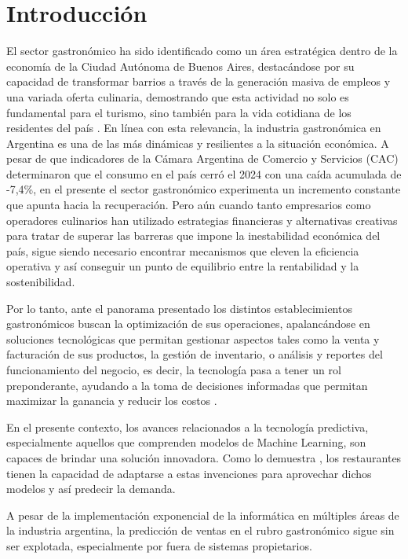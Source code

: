 \chapter{Introducción}

El sector gastronómico ha sido identificado como un área estratégica dentro de la economía de la Ciudad Autónoma de Buenos Aires, destacándose por su capacidad de transformar barrios a través de la generación masiva de empleos y una variada oferta culinaria, demostrando que esta actividad no solo es fundamental para el turismo, sino también para la vida cotidiana de los residentes del país \parencite{srsur2024gastronomico}. En línea con esta relevancia, la industria gastronómica en Argentina es una de las más dinámicas y resilientes a la situación económica. A pesar de que indicadores de la Cámara Argentina de Comercio y Servicios (CAC) \parencite{cac2024consumo} determinaron que el consumo en el país cerró el 2024 con una caída acumulada de -7,4\%, en el presente el sector gastronómico experimenta un incremento constante que apunta hacia la recuperación. Pero aún cuando tanto empresarios como operadores culinarios han utilizado estrategias financieras y alternativas creativas para tratar de superar las barreras que impone la inestabilidad económica del país, sigue siendo necesario encontrar mecanismos que eleven la eficiencia operativa y así conseguir un punto de equilibrio entre la rentabilidad y la sostenibilidad.

Por lo tanto, ante el panorama presentado los distintos establecimientos gastronómicos buscan la optimización de sus operaciones, apalancándose en soluciones tecnológicas que permitan gestionar aspectos tales como la venta y facturación de sus productos, la gestión de inventario, o análisis y reportes del funcionamiento del negocio, es decir, la tecnología pasa a tener un rol preponderante, ayudando a la toma de decisiones informadas que permitan maximizar la ganancia y reducir los costos  \parencite{agrawal2023predictive}.

En el presente contexto, los avances relacionados a la tecnología predictiva, especialmente aquellos que comprenden modelos de Machine Learning, son capaces de brindar una solución innovadora. Como lo demuestra \parencite{schmidt2022mlsales}, los restaurantes tienen la capacidad de adaptarse a estas invenciones para aprovechar dichos modelos y así predecir la demanda.

A pesar de la implementación exponencial de la informática en múltiples áreas de la industria argentina, la predicción de ventas en el rubro gastronómico sigue sin ser explotada, especialmente por fuera de sistemas propietarios.

